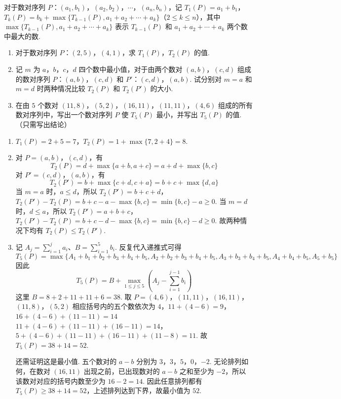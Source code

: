 \begin{problem}
对于数对序列 \(P\)：\((a_1, b_1)\)，\((a_2, b_2)\)，\(\cdots\)，\((a_n, b_n)\)，记 \(T_1(P) = a_1 + b_1\)，\(T_k(P) = b_k + \max \{T_{k-1}(P), a_1 + a_2 + \cdots + a_k\}\)（\(2 \leqslant k \leqslant n\)），其中 \(\max \{T_{k-1}(P), a_1 + a_2 + \cdots + a_k\}\) 表示 \(T_{k-1}(P)\) 和 \(a_1 + a_2 + \cdots + a_k\) 两个数中最大的数.

\begin{enumerate}
\item 对于数对序列 \(P\)：\((2,5)\)，\((4,1)\)，求 \(T_{1}(P)\)，\(T_{2}(P)\) 的值.
\item 记 \(m\) 为 \(a\)，\(b\)，\(c\)，\(d\) 四个数中最小值，对于由两个数对 \((a, b)\)，\((c, d)\) 组成的数对序列 \(P\)：\((a, b)\)，\((c, d)\) 和 \(P'\)：\((c, d)\)，\((a, b)\). 试分别对 \(m = a\) 和 \(m = d\) 时两种情况比较 \(T_{2}(P)\) 和 \(T_{2}(P')\) 的大小.
\item 在由 \(5\text{ 个数对}\) \((11,8)\)，\((5,2)\)，\((16,11)\)，\((11,11)\)，\((4,6)\) 组成的所有数对序列中，写出一个数对序列 \(P\) 使 \(T_{5}(P)\) 最小，并写出 \(T_{5}(P)\) 的值. （只需写出结论）
\end{enumerate}
\end{problem}

\begin{solution}
\begin{enumerate}
\item
\(T_{1}(P)=2+5=7\)，\(T_{2}(P)=1+\max\{7,2+4\}=8\).
\item 对 \(P=(a,b)\)，\((c,d)\)，有
\[
T_{2}(P)=d+\max\{a+b,a+c\}=a+d+\max\{b,c\}
\]
对 \(P'=(c,d)\)，\((a,b)\)，有
\[
T_{2}(P')=b+\max\{c+d,c+a\}=b+c+\max\{d,a\}
\]
当 \(m=a\) 时，\(a\leqslant d\)，所以
\(T_{2}(P')=b+c+d\)，\(T_{2}(P')-T_{2}(P)=b+c-a-\max\{b,c\} =\min\{b,c\}-a\geqslant0\).
当 \(m=d\) 时，\(d\leqslant a\)，所以
\(T_{2}(P')=a+b+c\)，\(T_{2}(P')-T_{2}(P)=b+c-d-\max\{b,c\} =\min\{b,c\}-d\geqslant0\).
故两种情况下均有 \(T_{2}(P)\leqslant T_{2}(P')\).
\item 记 \(A_j=\sum_{i=1}^{j}a_i\)、\(B=\sum_{i=1}^{5}b_i\). 反复代入递推式可得
\[
T_{5}(P)=\max\{A_{1}+b_{1}+b_{2}+b_{3}+b_{4}+b_{5},
A_{2}+b_{2}+b_{3}+b_{4}+b_{5},
A_{3}+b_{3}+b_{4}+b_{5},
A_{4}+b_{4}+b_{5},A_{5}+b_{5}\}
\]
因此
\[
T_{5}(P)=B+\max_{1\leqslant j\leqslant5}
\left(A_j-\sum_{i=1}^{j-1}b_i\right)
\]
这里 \(B=8+2+11+11+6=38\). 取
\(P=(4,6)\)，\((11,11)\)，\((16,11)\)，\((11,8)\)，\((5,2)\)
相应括号内的五个数依次为
\(4\)，\(11+(4-6)=9\)，\(16+(4-6)+(11-11)=14\)
\(11+(4-6)+(11-11)+(16-11)=14\)，\(5+(4-6)+(11-11)+(16-11)+(11-8)=11\).
故 \(T_{5}(P)=38+14=52\).

还需证明这是最小值. 五个数对的 \(a-b\) 分别为 \(3\)，\(3\)，\(5\)，\(0\)，\(-2\). 无论排列如何，在数对 \((16,11)\) 出现之前，已出现数对的 \(a-b\) 之和至少为 \(-2\)，所以该数对对应的括号内数至少为 \(16-2=14\). 因此任意排列都有 \(T_{5}(P)\geqslant38+14=52\)，上述排列达到下界，故最小值为 \(52\).
\end{enumerate}
\end{solution}
